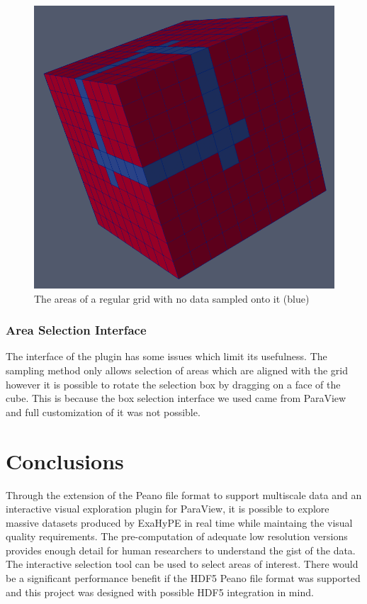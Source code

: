 \documentclass[12pt,a4paper]{article}
\begin{document}
\begin{figure}[h]
\centering
\includegraphics[scale=0.25]{data-artifacts}
\caption{The areas of a regular grid with no data sampled onto it (blue)}
\label{blank-artifacts}
\end{figure}

\subsubsection{Area Selection Interface}
The interface of the plugin has some issues which limit its usefulness. The sampling method only allows selection of areas which are aligned with the grid however it is possible to rotate the selection box by dragging on a face of the cube. This is because the box selection interface we used came from ParaView and full customization of it was not possible.

\section{Conclusions}

Through the extension of the Peano file format to support multiscale data and an interactive visual exploration plugin for ParaView, it is possible to explore massive datasets produced by ExaHyPE in real time while maintaing the visual quality requirements. The pre-computation of adequate low resolution versions provides enough detail for human researchers to understand the gist of the data. The interactive selection tool can be used to select areas of interest. There would be a significant performance benefit if the HDF5 Peano file format was supported and this project was designed with possible HDF5 integration in mind.
\end{document}
